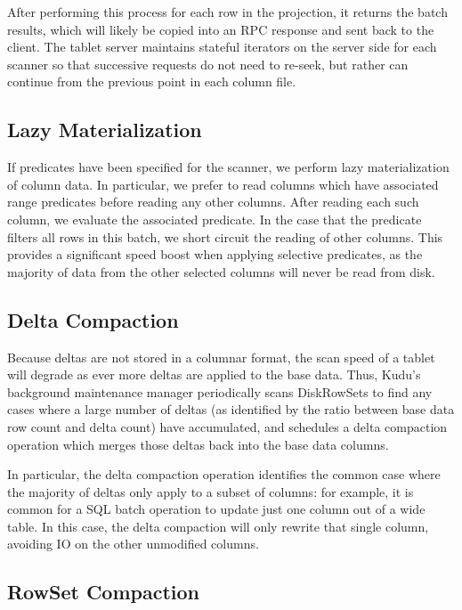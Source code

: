 \documentclass[twocolumn,9pt]{article}
\begin{document}
After performing this process for each row in the projection, it returns the batch results,
which will likely be copied into an RPC response and sent back to the client. The tablet
server maintains stateful iterators on the server side for each scanner so that successive
requests do not need to re-seek, but rather can continue from the previous point in each column file.

\subsection{Lazy Materialization}

If predicates have been specified for the scanner, we perform lazy
materialization\cite{abadi} of column data. In particular, we prefer
to read columns which have associated range predicates before reading any other
columns. After reading each such column, we evaluate the associated predicate.
In the case that the predicate filters all rows in this batch, we short circuit
the reading of other columns. This provides a significant speed boost when applying
selective predicates, as the majority of data from the other selected columns
will never be read from disk.

\subsection{Delta Compaction}

Because deltas are not stored in a columnar format, the scan speed of a tablet will
degrade as ever more deltas are applied to the base data. Thus, Kudu's background
maintenance manager periodically scans DiskRowSets to find any cases where a large number
of deltas (as identified by the ratio between base data row count and delta count) have accumulated,
and schedules a delta compaction operation which merges those
deltas back into the base data columns.

In particular, the delta compaction operation identifies the common case where the
majority of deltas only apply to a subset of columns: for example, it is common for a SQL
batch operation to update just one column out of a wide table.  In this case, the delta
compaction will only rewrite that single column, avoiding IO on the other unmodified columns.

\subsection{RowSet Compaction}
\label{sec:rowset_compaction}
\end{document}
